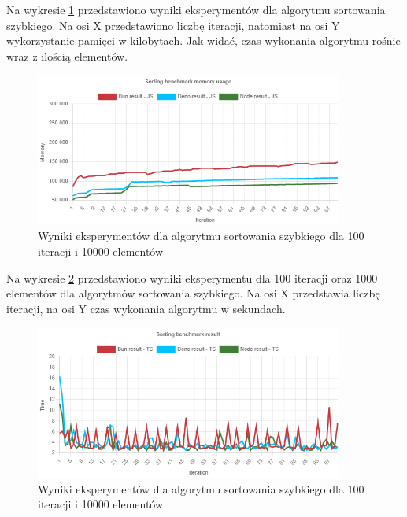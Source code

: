 Na wykresie \ref{fig:quick_sorting_e5_memory_js} przedstawiono wyniki eksperymentów dla algorytmu sortowania szybkiego. Na osi X przedstawiono liczbę iteracji, natomiast na osi Y wykorzystanie pamięci w kilobytach. Jak widać, czas wykonania algorytmu rośnie wraz z ilością elementów.
\begin{figure}[H]
  \centering
  \includegraphics[width=0.9\textwidth]{Figures/sorting/quick/e5_memory_js.png}
  \caption{Wyniki eksperymentów dla algorytmu sortowania szybkiego dla 100 iteracji i 10000 elementów}
  \label{fig:quick_sorting_e5_memory_js}
\end{figure}

Na wykresie \ref{fig:quick_sorting_e5_ts} przedstawiono wyniki eksperymentu dla 100 iteracji oraz 1000 elementów dla algorytmów sortowania szybkiego. Na osi X przedstawia liczbę iteracji, na osi Y czas wykonania algorytmu w sekundach. 

\begin{figure}[H]
  \centering
  \includegraphics[width=0.9\textwidth]{Figures/sorting/quick/e5_ts.png}
  \caption{Wyniki eksperymentów dla algorytmu sortowania szybkiego dla 100 iteracji i 10000 elementów}
  \label{fig:quick_sorting_e5_ts}
\end{figure}

